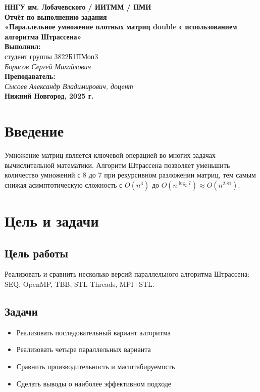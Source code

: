 \documentclass[12pt]{article}
\begin{document}
\begin{titlepage}
    \begin{center}
        \large 
        \textbf{ННГУ им. Лобачевского / ИИТММ / ПМИ}\\[0.5cm]

        \vspace{4cm}
        \textbf{\Large Отчёт по выполнению задания}\\
        \textbf{\large «Параллельное умножение плотных матриц double с использованием алгоритма Штрассена»}\\[3cm]

        \vspace{3cm}
        \textbf{Выполнил:}\\
        студент группы 3822Б1ПМоп3 \\
        \textit{Борисов Сергей Михайлович}\\[1cm]

        \textbf{Преподаватель:}\\
        \textit{Сысоев Александр Владимирович, доцент}\\[2cm]

        \vfill
        \textbf{Нижний Новгород, 2025 г.}
    \end{center}
\end{titlepage}

\tableofcontents
\newpage

\section{Введение}
Умножение матриц является ключевой операцией во многих задачах вычислительной математики. Алгоритм Штрассена позволяет уменьшить количество умножений с 8 до 7 при рекурсивном разложении матриц, тем самым снижая асимптотическую сложность с $O(n^3)$ до $O(n^{\log_2 7}) \approx O(n^{2.81})$.

\section{Цель и задачи}
\subsection*{Цель работы}
Реализовать и сравнить несколько версий параллельного алгоритма Штрассена: SEQ, OpenMP, TBB, STL Threads, MPI+STL.

\subsection*{Задачи}
\begin{itemize}
  \item Реализовать последовательный вариант алгоритма
  \item Реализовать четыре параллельных варианта
  \item Сравнить производительность и масштабируемость
  \item Сделать выводы о наиболее эффективном подходе
\end{itemize}
\end{document}
